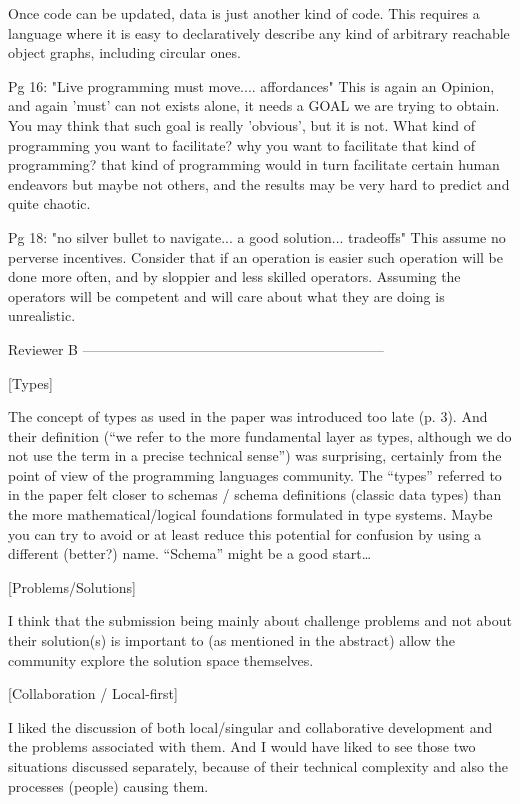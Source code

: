 Once code can be updated, data is just another kind of code. This requires a language where it is easy to declaratively describe any kind of arbitrary reachable object graphs, including circular ones.

Pg 16: "Live programming must move.... affordances" This is again an Opinion, and again 'must' can not exists alone, it needs a GOAL we are trying to obtain. You may think that such goal is really 'obvious', but it is not. What kind of programming you want to facilitate? why you want to facilitate that kind of programming? that kind of programming would in turn facilitate certain human endeavors but maybe not others, and the results may be very hard to predict and quite chaotic.

Pg 18: "no silver bullet to navigate... a good solution... tradeoffs" This assume no perverse incentives. Consider that if an operation is easier such operation will be done more often, and by sloppier and less skilled operators. Assuming the operators will be competent and will care about what they are doing is unrealistic.


Reviewer B
-----------------------------------------------------------------

[Types]

The concept of types as used in the paper was introduced too late (p. 3). And their definition (“we refer to the more fundamental layer as types, although we do not use the term in a precise technical sense”) was surprising, certainly from the point of view of the programming languages community. The “types” referred to in the paper felt closer to schemas / schema definitions (classic data types) than the more mathematical/logical foundations formulated in type systems. Maybe you can try to avoid or at least reduce this potential for confusion by using a different (better?) name. “Schema” might be a good start…

[Problems/Solutions]

I think that the submission being mainly about challenge problems and not about their solution(s) is important to (as mentioned in the abstract) allow the community explore the solution space themselves.

[Collaboration / Local-first]

I liked the discussion of both local/singular and collaborative development and the problems associated with them. And I would have liked to see those two situations discussed separately, because of their technical complexity and also the processes (people) causing them.

